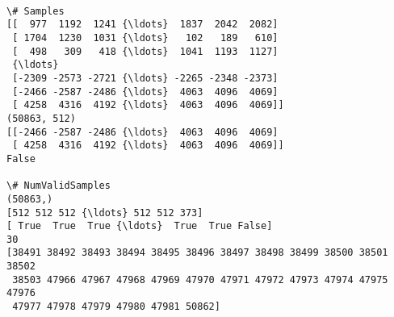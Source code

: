 \documentclass[11pt]{article}
\begin{document}
    \begin{Verbatim}[commandchars=\\\{\}]

\# Samples
[[  977  1192  1241 {\ldots}  1837  2042  2082]
 [ 1704  1230  1031 {\ldots}   102   189   610]
 [  498   309   418 {\ldots}  1041  1193  1127]
 {\ldots}
 [-2309 -2573 -2721 {\ldots} -2265 -2348 -2373]
 [-2466 -2587 -2486 {\ldots}  4063  4096  4069]
 [ 4258  4316  4192 {\ldots}  4063  4096  4069]]
(50863, 512)
[[-2466 -2587 -2486 {\ldots}  4063  4096  4069]
 [ 4258  4316  4192 {\ldots}  4063  4096  4069]]
False

\# NumValidSamples
(50863,)
[512 512 512 {\ldots} 512 512 373]
[ True  True  True {\ldots}  True  True False]
30
[38491 38492 38493 38494 38495 38496 38497 38498 38499 38500 38501 38502
 38503 47966 47967 47968 47969 47970 47971 47972 47973 47974 47975 47976
 47977 47978 47979 47980 47981 50862]

    \end{Verbatim}


    
    
    
    
\end{document}
